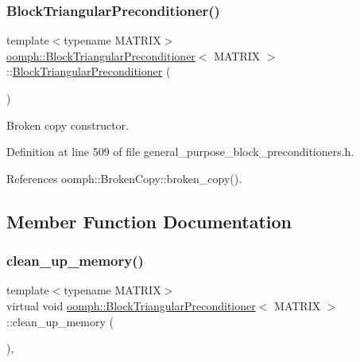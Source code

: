 \subsubsection{\texorpdfstring{Block\+Triangular\+Preconditioner()}{BlockTriangularPreconditioner()}\hspace{0.1cm}{\footnotesize\ttfamily [2/2]}}
{\footnotesize\ttfamily template$<$typename M\+A\+T\+R\+IX$>$ \\
\hyperlink{classoomph_1_1BlockTriangularPreconditioner}{oomph\+::\+Block\+Triangular\+Preconditioner}$<$ M\+A\+T\+R\+IX $>$\+::\hyperlink{classoomph_1_1BlockTriangularPreconditioner}{Block\+Triangular\+Preconditioner} (\begin{DoxyParamCaption}\item[{const \hyperlink{classoomph_1_1BlockTriangularPreconditioner}{Block\+Triangular\+Preconditioner}$<$ M\+A\+T\+R\+IX $>$ \&}]{ }\end{DoxyParamCaption})\hspace{0.3cm}{\ttfamily [inline]}}



Broken copy constructor. 



Definition at line 509 of file general\+\_\+purpose\+\_\+block\+\_\+preconditioners.\+h.



References oomph\+::\+Broken\+Copy\+::broken\+\_\+copy().



\subsection{Member Function Documentation}
\mbox{\label{classoomph_1_1BlockTriangularPreconditioner_aec59a3bb131cd924d3efa6873a187a0f}} 
\subsubsection{\texorpdfstring{clean\+\_\+up\+\_\+memory()}{clean\_up\_memory()}}
{\footnotesize\ttfamily template$<$typename M\+A\+T\+R\+IX$>$ \\
virtual void \hyperlink{classoomph_1_1BlockTriangularPreconditioner}{oomph\+::\+Block\+Triangular\+Preconditioner}$<$ M\+A\+T\+R\+IX $>$\+::clean\+\_\+up\+\_\+memory (\begin{DoxyParamCaption}{ }\end{DoxyParamCaption})\hspace{0.3cm}{\ttfamily [inline]}, {\ttfamily [virtual]}}



